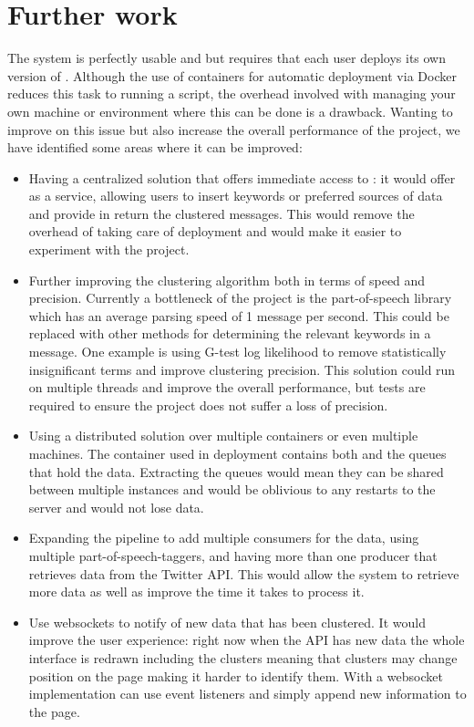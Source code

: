 \chapter{Further work}
\label{sec:furtherwork}

The system is perfectly usable and but requires that each user deploys its own version of {\project}. Although the use of containers for automatic deployment via Docker reduces this task to running a script, the overhead involved with managing your own machine or environment where this can be done is a drawback. Wanting to improve on this issue but also increase the overall performance of the project, we have identified some areas where it can be improved:
\begin{itemize}
	\item Having a centralized solution that offers immediate access to {\project}: it would offer {\project}  as a service, allowing users to insert keywords or preferred sources of data and provide in return the clustered messages. This would remove the overhead of taking care of deployment and would make it easier to experiment with the project.
	\item Further improving the clustering algorithm both in terms of speed and precision. Currently a bottleneck of the project is the part-of-speech library which has an average parsing speed of 1 message per second. This could be replaced with other methods for determining the relevant keywords in a message. One example is using G-test log likelihood to remove statistically insignificant terms and improve clustering precision. This solution could run on multiple threads and improve the overall performance, but tests are required to ensure the project does not suffer a loss of precision.
	\item Using a distributed solution over multiple containers or even multiple machines. The container used in deployment contains both {\project}  and the queues that hold the data. Extracting the queues would mean they can be shared between multiple instances and would be oblivious to any restarts to the server and would not lose data.
	\item Expanding the pipeline to add multiple consumers for the data, using multiple part-of-speech-taggers, and having more than one producer that retrieves data from the Twitter API. This would allow the system to retrieve more data as well as improve the time it takes to process it.
	\item Use websockets to notify {\frontend}  of new data that has been clustered. It would improve the user experience: right now when the API has new data the whole interface is redrawn including the clusters meaning that clusters may change position on the page making it harder to identify them. With a websocket implementation {\frontend}  can use event listeners and simply append new information to the page.

\end{itemize}
